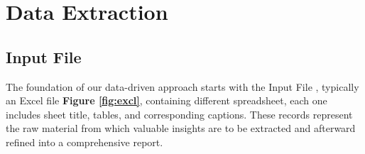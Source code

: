     
    
    
    

\section{Data Extraction}

\subsection{Input File}
The foundation of our data-driven approach starts with the Input File , typically an Excel file \textbf{Figure \ref{fig:excl}}, containing different spreadsheet, each one includes sheet title, tables, and corresponding captions. These records represent the raw material from which valuable insights are to be extracted and afterward refined into a comprehensive report.

